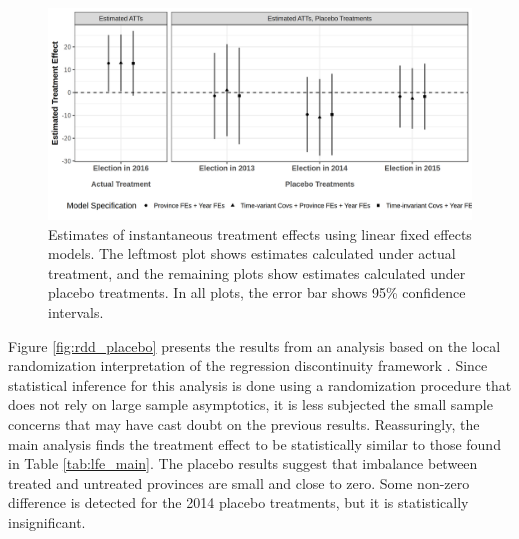 \documentclass[12pt]{article}
\newcommand{\1}{\mathbbm{1}}
\begin{document}
\begin{figure}[!htbp]
	\centering
	\includegraphics[width=\textwidth]{figure/190311_lfe_placebo.png}
	\captionsetup{singlelinecheck=off}
	\caption[Estimated placebo linear fixed effects treatment effects]{Estimates of instantaneous treatment effects using linear fixed effects models. The leftmost plot shows estimates calculated under actual treatment, and the remaining plots show estimates calculated under placebo treatments. In all plots, the error bar shows 95\% confidence intervals.}
	\label{fig:lfe_placebo}
\end{figure}

Figure \ref{fig:rdd_placebo} presents the results from an analysis based on the local randomization interpretation of the regression discontinuity framework \citep{CattaneoTitiunik2015}. Since statistical inference for this analysis is done using a randomization procedure that does not rely on large sample asymptotics, it is less subjected the small sample concerns that may have cast doubt on the previous results. Reassuringly, the main analysis finds the treatment effect to be statistically similar to those found in Table \ref{tab:lfe_main}. The placebo results suggest that imbalance between treated and untreated provinces are small and close to zero. Some non-zero difference is detected for the 2014 placebo treatments, but it is statistically insignificant. 
\end{document}
